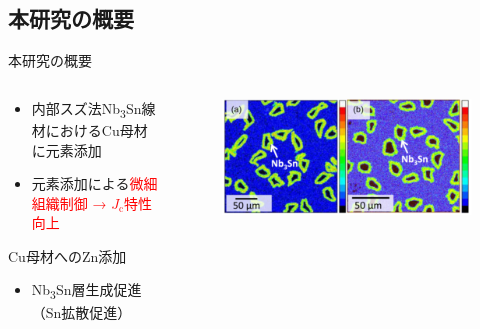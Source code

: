 \documentclass[aspectratio=169, unicode, 10pt]{beamer}
\begin{document}
	\subsection{本研究の概要}
	\begin{frame}{本研究の概要}
		\begin{columns}
			\begin{column}{0.6\linewidth}
				\begin{itemize}
					\item 内部スズ法Nb\textsubscript{3}Sn線材におけるCu母材に元素添加
					\item 元素添加による\textcolor{red}{微細組織制御 → $J_\mathrm{c}$特性向上}
				\end{itemize}
				\begin{block}{Cu母材へのZn添加}
					\begin{itemize}
						\item Nb\textsubscript{3}Sn層生成促進（Sn拡散促進）
					\end{itemize}
				\end{block}
			\end{column}
			\begin{column}{0.4\linewidth}
				\begin{figure}
					\centering
					\includegraphics[width=\linewidth]{figs/effectofZnadditionNb3Snwidth.png}
				\end{figure}
			\end{column}
		\end{columns}

		\vspace{20pt}
		\centering
	\end{frame}
\end{document}

